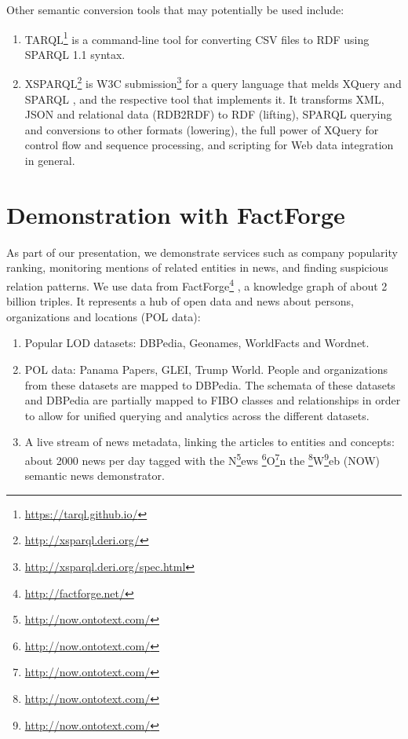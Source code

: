 \documentclass[runningheads,a4paper]{llncs}
\begin{document}
Other semantic conversion tools that may potentially be used include:
\begin{enumerate}
\item TARQL\footnote{\url{https://tarql.github.io/}} is a command-line tool for converting CSV files to RDF using SPARQL 1.1 syntax.
\item XSPARQL\footnote{\url{http://xsparql.deri.org/}} \cite{__RefNumPara__8272_1562275339} is W3C submission\footnote{\url{http://xsparql.deri.org/spec.html}} for a query language that melds XQuery  \cite{__RefNumPara__7336_1562275339} and SPARQL  \cite{__RefNumPara__859_1597909725}, and the respective tool that implements it. It transforms XML, JSON and relational data (RDB2RDF) to RDF (lifting), SPARQL querying and conversions to other formats (lowering), the full power of XQuery for control flow and sequence processing, and scripting for Web data integration in general.
\end{enumerate}

\section{Demonstration with FactForge}

As part of our presentation, we demonstrate services such as company popularity ranking, monitoring mentions of related entities in news, and finding suspicious relation patterns. We use data from FactForge\footnote{\url{http://factforge.net/}} \cite{__RefNumPara__3722_1458423281}, a knowledge graph of about 2 billion triples. It represents a hub of open data and news about persons, organizations and locations (POL data):
\begin{enumerate}
\item Popular LOD datasets: DBPedia, Geonames, WorldFacts and Wordnet.
\item POL data: Panama Papers, GLEI, Trump World. People and organizations from these datasets are mapped to DBPedia. The schemata of these datasets and DBPedia are partially mapped to FIBO classes and relationships in order to allow for unified querying and analytics across the different datasets.
\item A live stream of news metadata, linking the articles to entities and concepts: about 2000 news per day tagged with the N\footnote{\url{http://now.ontotext.com/}}ews \footnote{\url{http://now.ontotext.com/}}O\footnote{\url{http://now.ontotext.com/}}n the \footnote{\url{http://now.ontotext.com/}}W\footnote{\url{http://now.ontotext.com/}}eb (NOW) semantic news demonstrator.
\end{enumerate}
\end{document}
